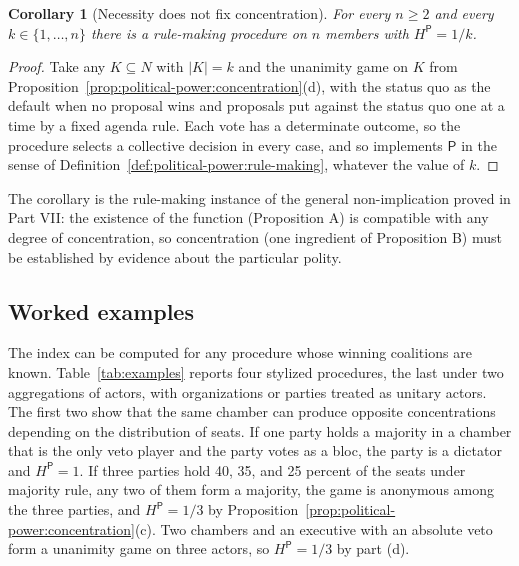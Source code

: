 \documentclass[11pt,letterpaper]{article}
\newtheorem{corollary}[theorem]{Corollary}
\theoremstyle{definition}
\theoremstyle{remark}
\newcommand{\pP}{\mathsf{P}}
\begin{document}
\begin{corollary}[Necessity does not fix concentration]
\label{cor:political-power:any-h}
For every $n\ge2$ and every $k\in\{1,\dots,n\}$ there is a rule-making procedure on $n$ members with $H^{\pP}=1/k$.
\end{corollary}

\begin{proof}
Take any $K\subseteq N$ with $|K|=k$ and the unanimity game on $K$ from Proposition~\ref{prop:political-power:concentration}(d), with the status quo as the default when no proposal wins and proposals put against the status quo one at a time by a fixed agenda rule. Each vote has a determinate outcome, so the procedure selects a collective decision in every case, and so implements $\pP$ in the sense of Definition~\ref{def:political-power:rule-making}, whatever the value of $k$.
\end{proof}

The corollary is the rule-making instance of the general non-implication proved in Part VII: the existence of the function (Proposition A) is compatible with any degree of concentration, so concentration (one ingredient of Proposition B) must be established by evidence about the particular polity.

\subsection{Worked examples}

The index can be computed for any procedure whose winning coalitions are known. Table~\ref{tab:examples} reports four stylized procedures, the last under two aggregations of actors, with organizations or parties treated as unitary actors. The first two show that the same chamber can produce opposite concentrations depending on the distribution of seats. If one party holds a majority in a chamber that is the only veto player and the party votes as a bloc, the party is a dictator and $H^{\pP}=1$. If three parties hold 40, 35, and 25 percent of the seats under majority rule, any two of them form a majority, the game is anonymous among the three parties, and $H^{\pP}=1/3$ by Proposition~\ref{prop:political-power:concentration}(c). Two chambers and an executive with an absolute veto form a unanimity game on three actors, so $H^{\pP}=1/3$ by part (d).
\end{document}
